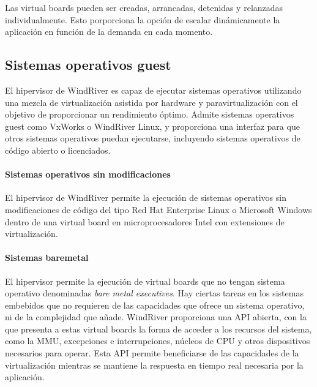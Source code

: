 Las virtual boards pueden ser creadas, arrancadas, detenidas y relanzadas individualmente. Esto porporciona la opción de escalar dinámicamente la aplicación en función de la demanda en cada momento.

\subsection{Sistemas operativos guest}
El hipervisor de WindRiver es capaz de ejecutar sistemas operativos utilizando una mezcla de virtualización asistida por hardware y paravirtualización con el objetivo de proporcionar un rendimiento óptimo. Admite sistemas operativos guest como VxWorks o WindRiver Linux, y proporciona una interfaz para que otros sistemas operativos puedan ejecutarse, incluyendo sistemas operativos de código abierto o licenciados.\\

\paragraph{Sistemas operativos sin modificaciones} El hipervisor de WindRiver permite la ejecución de sistemas operativos sin modificaciones de código del tipo Red Hat Enterprise Linux o Microsoft Windows dentro de una virtual board en microprocesadores Intel con extensiones de virtualización.\\

\paragraph{Sistemas baremetal}
El hipervisor permite la ejecución de virtual boards que no tengan sistema operativo denominadas \textit{bare metal executives}. Hay ciertas tareas en los sistemas embebidos que no requieren de las capacidades que ofrece un sistema operativo, ni de la complejidad que añade. WindRiver proporciona una API abierta, con la que presenta a estas virtual boards la forma de acceder a los recursos del sistema, como la \acrshort{MMU}, excepciones e interrupciones, núcleos de CPU y otros dispositivos necesarios para operar. Esta API permite beneficiarse de las capacidades de la virtualización mientras se mantiene la respuesta en tiempo real necesaria por la aplicación.

